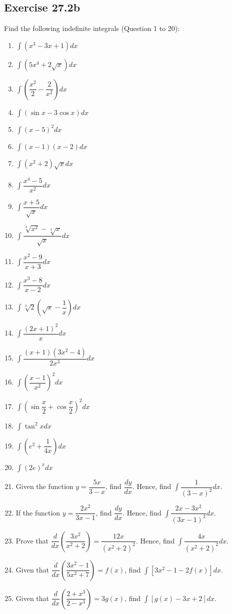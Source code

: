 \documentclass{report}
\begin{document}
\subsection{Exercise 27.2b}
Find the following indefinite integrals (Question 1 to 20):
\begin{enumerate}
    \item $\displaystyle\int(x^3 - 3x + 1)dx$
    \item $\displaystyle\int\left(5x^4 + 2\sqrt{x}\right)dx$
    \item $\displaystyle\int\left({\dfrac{x^{2}}{2}}-{\dfrac{2}{x^{2}}}\right)dx$
    \item $\displaystyle\int(\sin x-3\cos x)dx$
    \item $\displaystyle\int(x-5)^2dx$
    \item $\displaystyle\int(x-1)(x-2)dx$
    \item $\displaystyle\int(x^2 + 2)\sqrt{x}dx$
    \item $\displaystyle\int\dfrac{x^4 - 5}{x^2}dx$
    \item $\displaystyle\int\dfrac{x+5}{\sqrt{x}}dx$
    \item $\displaystyle\int\dfrac{\sqrt[3]{x^2} - \sqrt[4]{x}}{\sqrt{x}}dx$
    \item $\displaystyle\int\dfrac{x^2 - 9}{x + 3}dx$
    \item $\displaystyle\int\dfrac{x^3 - 8}{x - 2}dx$
    \item $\displaystyle\int\sqrt[3]{2}\left(\sqrt{x} - \dfrac{1}{x}\right)dx$
    \item $\displaystyle\int\dfrac{(2x + 1)^2}{x}dx$
    \item $\displaystyle\int\dfrac{(x + 1)(3x^2 - 4)}{2x^3}dx$
    \item $\displaystyle\int\left(\dfrac{x - 1}{x^2}\right)^2dx$
    \item $\displaystyle\int\left(\sin\dfrac{x}{2} + \cos\dfrac{x}{2}\right)^2dx$
    \item $\displaystyle\int\tan^2xdx$
    \item $\displaystyle\int\left(e^2 + \dfrac{1}{4x}\right)dx$
    \item $\displaystyle\int(2e)^xdx$
    \item Given the function $y = \dfrac{5x}{3 - x}$, find $\dfrac{dy}{dx}$. Hence, find
          $\displaystyle\int\dfrac{1}{(3 - x)^2}dx$.
    \item If the function $y = \dfrac{2x^2}{3x - 1}$, find $\dfrac{dy}{dx}$. Hence, find
          $\displaystyle\int\dfrac{2x - 3x^2}{(3x - 1)^2}dx$.
    \item Prove that $\dfrac{d}{dx}\left(\dfrac{3x^2}{x^2 + 2}\right) = \dfrac{12x}{(x^2
                  + 2)^2}$. Hence, find $\displaystyle\int\dfrac{4x}{(x^2 + 2)^2}dx$.
    \item Given that ${\dfrac{d}{dx}}{\left(\dfrac{3x^{2}-1}{5x^{2}+7}\right)}=f(x)$,
          find $\displaystyle\int\left[3x^2 - 1 - 2f(x)\right]dx$.
    \item Given that ${\dfrac{d}{dx}}\left({\dfrac{2+x^{3}}{2-x^{3}}}\right)=3g(x)$, find
          $\displaystyle\int\left[g(x) - 3x + 2\right]dx$.
\end{enumerate}
\end{document}
